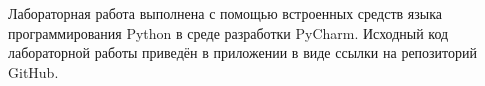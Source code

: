 \documentclass[../body.tex]{subfiles}
\begin{document}
	Лабораторная работа выполнена с помощью встроенных средств языка программирования Python в среде разработки PyCharm. Исходный код лабораторной работы приведён в приложении в виде ссылки на репозиторий GitHub.
	
\end{document}
